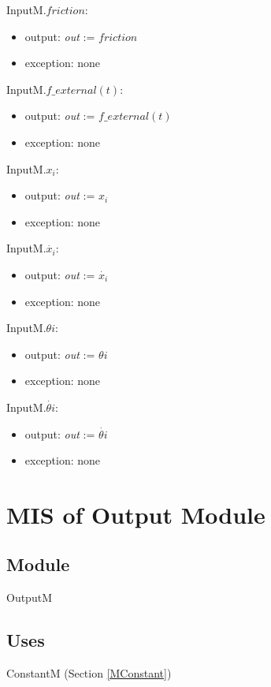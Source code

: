 \documentclass[12pt, titlepage]{article}
\begin{document}
\noindent InputM.$friction$:
\begin{itemize}
\item output: \textit{out} := $friction$
\item exception: none
\end{itemize}\noindent 

\noindent InputM.$f\_external(t)$:
\begin{itemize}
\item output: \textit{out} := $f\_external(t)$
\item exception: none
\end{itemize}\noindent

\noindent InputM.$x_i$:
\begin{itemize}
\item output: \textit{out} := $x_i$
\item exception: none
\end{itemize}

\noindent InputM.$\dot{x_i}$:
\begin{itemize}
\item output: \textit{out} := $\dot{x_i}$
\item exception: none
\end{itemize}

\noindent InputM.$\theta{i}$:
\begin{itemize}
\item output: \textit{out} := $\theta{i}$
\item exception: none
\end{itemize}

\noindent InputM.$\dot{\theta{i}}$:
\begin{itemize}
\item output: \textit{out} := $\dot{\theta{i}}$
\item exception: none
\end{itemize}



\newpage
\section{MIS of Output Module\label{MOutput} }


\subsection{Module}
OutputM

\subsection{Uses}
ConstantM (Section \ref{MConstant})
\end{document}
